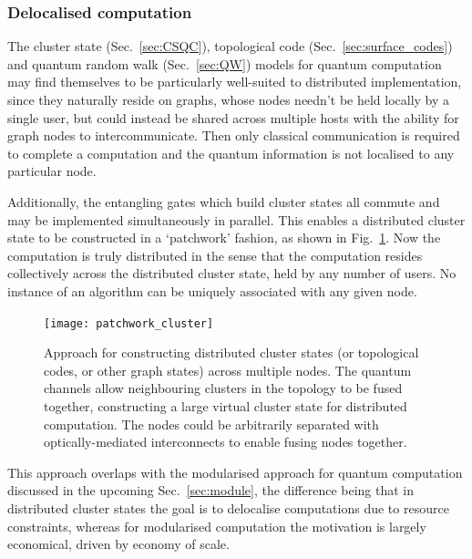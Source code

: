 \subsubsection{Delocalised computation}

The cluster state (Sec.~\ref{sec:CSQC}), topological code (Sec.~\ref{sec:surface_codes}) and quantum random walk (Sec.~\ref{sec:QW}) models for quantum computation may find themselves to be particularly well-suited to distributed implementation, since they naturally reside on graphs, whose nodes needn't be held locally by a single user, but could instead be shared across multiple hosts with the ability for graph nodes to intercommunicate. Then only classical communication is required to complete a computation and the quantum information is not localised to any particular node.

Additionally, the entangling gates which build cluster states all commute and may be implemented simultaneously in parallel. This enables a distributed cluster state to be constructed in a `patchwork' fashion, as shown in Fig.~\ref{fig:patchwork_cluster}. Now the computation is truly distributed in the sense that the computation resides collectively across the distributed cluster state, held by any number of users. No instance of an algorithm can be uniquely associated with any given node.

\begin{figure}[!htbp]
\texttt{[image: patchwork\_cluster]} 
\captionspacefig \caption{Approach for constructing distributed cluster states (or topological codes, or other graph states) across multiple nodes. The quantum channels allow neighbouring clusters in the topology to be fused together, constructing a large virtual cluster state for distributed computation. The nodes could be arbitrarily separated with optically-mediated interconnects to enable fusing nodes together.} \label{fig:patchwork_cluster}
\end{figure}

This approach overlaps with the modularised approach for quantum computation discussed in the upcoming Sec.~\ref{sec:module}, the difference being that in distributed cluster states the goal is to delocalise computations due to resource constraints, whereas for modularised computation the motivation is largely economical, driven by economy of scale.

%
%

